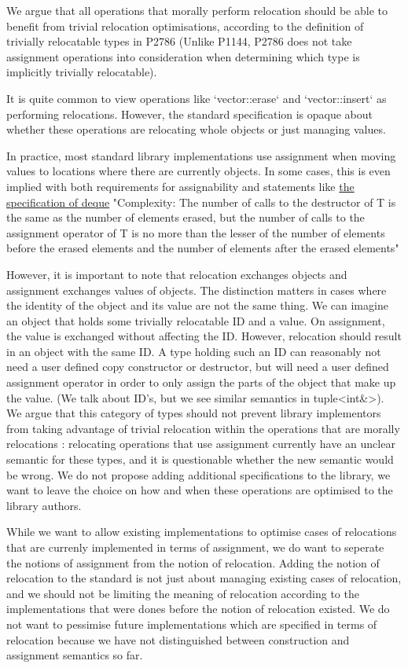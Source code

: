 \documentclass{wg21}
\begin{document}
We argue that all operations that morally perform relocation should be able to benefit from trivial relocation optimisations, according to the definition of trivially relocatable types in P2786 (Unlike P1144, P2786 does not take assignment operations into consideration when determining which type is implicitly trivially relocatable).

It is quite common to view operations like `vector::erase` and `vector::insert` as performing relocations. However, the standard specification is opaque about whether these operations are relocating whole objects or just managing values.

In practice, most standard library implementations use assignment when moving values to locations where there are currently objects.  In some cases, this is even implied with both requirements for assignability and statements like
\href{https://eel.is/c++draft/sequences#deque.modifiers-6}{the specification of deque}
"Complexity: The number of calls to the destructor of T is the same as the number of elements erased, but the number of calls to the assignment operator of T is no more than the lesser of the number of elements before the erased elements and the number of elements after the erased elements"

However, it is important to note that relocation exchanges objects and assignment exchanges values of objects. The distinction matters in cases where the identity of the object and its value are not the same thing. We can imagine an object that holds some trivially relocatable ID and a value. On assignment, the value is exchanged without affecting the ID. However, relocation should result in an object with the same ID. A type holding such an ID can reasonably not need a user defined copy constructor or destructor, but will need a user defined assignment operator in order to only assign the parts of the object that make up the value. (We talk about ID's, but we see similar semantics in tuple<int&>). We argue that this category of types should not prevent library implementors from taking advantage of trivial relocation within the operations that are morally relocations : relocating operations that use assignment currently have an unclear semantic for these types, and it is questionable whether the new semantic would be wrong. We do not propose adding additional specifications to the library, we want to leave the choice on how and when these operations are optimised to the library authors.


While we want to allow existing implementations to optimise cases of relocations that are currenly implemented in terms of assignment, we do want to seperate the notions of assignment from the notion of relocation. Adding the notion of relocation to the standard is not just about managing existing cases of relocation, and we should not be limiting the meaning of relocation according to the implementations that were dones before the notion of relocation existed. We do not want to pessimise future implementations which are specified in terms of relocation because we have not distinguished between construction and assignment semantics so far.
\end{document}
